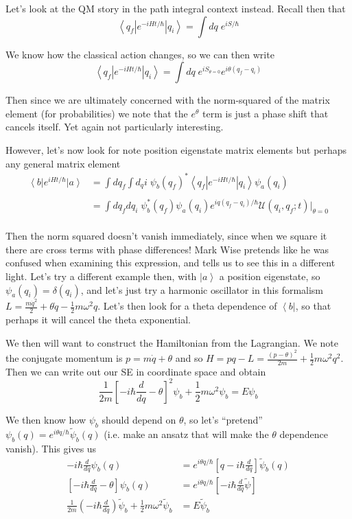 \documentclass[10pt]{report}
\newcommand{\bra}[1]{\left<#1\right|}
\newcommand{\ket}[1]{\left|#1\right>}
\newcommand{\rd}[2]{\frac{d#1}{d#2}}
\begin{document}
Let's look at the QM story in the path integral context instead. Recall then that
\begin{equation}
    \bra{q_f}e^{-iHt/\hbar}\ket{q_i} = \int dq\; e^{iS/\hbar}
\end{equation}

We know how the classical action changes, so we can then write
\begin{equation}
    \bra{q_f}e^{-iHt/\hbar}\ket{q_i} = \int dq\; e^{iS_{\theta = 0}}e^{i\theta(q_f - q_i)}
\end{equation}

Then since we are ultimately concerned with the norm-squared of the matrix element (for probabilities) we note that the $e^\theta$ term is just a phase shift that cancels itself. Yet again not particularly interesting.

However, let's now look for note position eigenstate matrix elements but perhaps any general matrix element
\begin{align}
    \bra{b}e^{iHt/\hbar}\ket{a} &= \displaystyle\int\limits_{}^{}dq_f\displaystyle\int\limits_{}^{}d_qi\;\psi_b(q_f)^*\bra{q_f}e^{-iHt/\hbar}\ket{q_i}\psi_a(q_i)\\
    &= \displaystyle\int\limits_{}^{}dq_fdq_i\;\psi_b^*(q_f)\psi_a(q_i)e^{iq(q_f - q_i)/\hbar}\mathcal{U}(q_i, q_f;t)\Big|_{\theta = 0}
\end{align}

Then the norm squared doesn't vanish immediately, since when we square it there are cross terms with phase differences! Mark Wise pretends like he was confused when examining this expression, and tells us to see this in a different light. Let's try a different example then, with $\ket{a}$ a position eigenstate, so $\psi_a(q_i) = \delta(q_i)$, and let's just try a harmonic oscillator in this formalism $L = \frac{m\dot{q}^2}{2} + \theta \dot{q} - \frac{1}{2}m\omega^2 q$. Let's then look for a theta dependence of $\bra{b}$, so that perhaps it will cancel the theta exponential. 

We then will want to construct the Hamiltonian from the Lagrangian. We note the conjugate momentum is $p = m\dot{q} + \theta$ and so $H = pq-L = \frac{(p-\theta)^2}{2m} + \frac{1}{2}m\omega^2q^2$. Then we can write out our SE in coordinate space and obtain
\begin{equation}
    \frac{1}{2m}\left[ -i\hbar\rd{}{q} - \theta \right]^2\psi_b + \frac{1}{2}m\omega^2\psi_b = E\psi_b
\end{equation}

We then know how $\psi_b$ should depend on $\theta$, so let's ``pretend'' $\psi_b(q) = e^{i\theta q/\hbar}\tilde{\psi}_b(q)$ (i.e. make an ansatz that will make the $\theta$ dependence vanish). This gives us
\begin{align}
    -i\hbar\rd{}{q}\psi_b(q) &= e^{i\theta q/\hbar}\left[ q - i\hbar \rd{}{q} \right]\tilde{\psi}_b(q)\\
    \left[ -i\hbar \rd{}{q} - \theta \right]\psi_b(q) &= e^{i\theta q/\hbar}\left[ -i\hbar \rd{}{q}\tilde{\psi} \right]\\
    \frac{1}{2m}\left( -i\hbar \rd{}{q} \right)\tilde{\psi}_b + \frac{1}{2}m\omega^2 \tilde{\psi}_b &= E\tilde{\psi}_b
\end{align}
\end{document}
